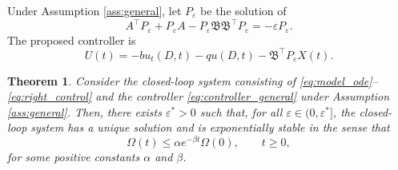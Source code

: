 \documentclass[journal]{IEEEtran}
\newtheorem{theorem}{Theorem}
\newcommand{\eps}{\varepsilon}
\newcommand{\Bcal}{\mathfrak B}
\begin{document}
Under Assumption \ref{ass:general}, let $P_\eps$ be the solution of
\begin{equation}
 A^\top P_\eps+P_\eps A-P_\eps\Bcal\Bcal^\top P_\eps=-\eps P_\eps.\label{eq:ARE_general}
\end{equation}
The proposed controller is
\begin{equation}
 U(t)=-bu_t(D,t)-qu(D,t)-\Bcal^\top P_\eps X(t).\label{eq:controller_general}
\end{equation}

\begin{theorem}\label{thm:general}
Consider the closed-loop system consisting of \eqref{eq:model_ode}--\eqref{eq:right_control} and the controller \eqref{eq:controller_general} under Assumption \ref{ass:general}. Then, there exists $\eps^*>0$ such that, for all $\eps\in(0,\eps^*]$, the closed-loop system has a unique solution and is exponentially stable in the sense that
\begin{equation}
 \Omega(t)\le \alpha e^{-\beta t}\Omega(0),\qquad t\ge0,\label{eq:theorem_general_decay}
\end{equation}
for some positive constants $\alpha$ and $\beta$.
\end{theorem}
\end{document}

